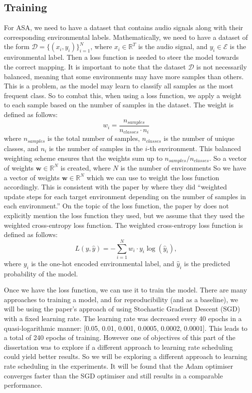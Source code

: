 \documentclass[logo,bsc,singlespacing,parskip,online]{infthesis}
\begin{document}
\subsection{Training}
For ASA, we need to have a dataset that contains audio signals along with their corresponding environmental labels. 
Mathematically, we need to have a dataset of the form \(\mathcal{D} = \{(x_i, y_i)\}_{i=1}^{N}\), where \(x_i \in \mathbb{R}^{T}\) is the audio signal, and \(y_i \in \mathcal{E}\) is the environmental label.
Then a loss function is needed to steer the model towards the correct mapping.
It is important to note that the dataset \(\mathcal{D}\) is not necessarily balanced,
meaning that some environments may have more samples than others.
This is a problem, as the model may learn to classify all samples as the most frequent class. 
So to combat this, when using a loss function, we apply a weight to each sample based on the number of samples in the dataset.
The weight is defined as follows:
\[
w_i = \frac{n_{samples}}{n_{classes} \cdot n_i}
\]
where \(n_{samples}\) is the total number of samples, \(n_{classes}\) is the number of unique classes, and \(n_i\) is the number of samples in the \(i\)-th environment.
This balanced weighting scheme ensures that the weights sum up to \(n_{samples}/n_{classes}\).
So a vector of weights \(\mathbf{w} \in \mathbb{R}^{N}\) is created, where \(N\) is the number of environments
So we have a vector of weights \(\mathbf{w} \in \mathbb{R}^{N}\) which we can use to weight the loss function accordingly.
This is consistent with the paper by \citet{Huwel2020HearDS} where they did ``weighted update steps for each target environment depending on the number of samples in each environment.''
On the topic of the loss function, the paper by \citet{Huwel2020HearDS} does 
not explicitly mention the loss function they used, but we assume that they used the weighted cross-entropy loss function.
The weighted cross-entropy loss function is defined as follows:
\[
L(y, \hat{y}) = -\sum_{i=1}^{N} w_i \cdot y_i \log(\hat{y}_i),
\]
where \(y_i\) is the one-hot encoded environmental label, and \(\hat{y}_i\) is the predicted probability of the model.

Once we have the loss function, we can use it to train the model. There are many approaches to training a model,
and for reproducibility (and as a baseline), we will be using the paper's approach of using Stochastic Gradient Descent (SGD) with a fixed learning rate.
The learning rate was decreased every 40 epochs in a quasi-logarithmic manner: [0.05, 0.01, 0.001, 0.0005, 0.0002, 0.0001].
This leads to a total of 240 epochs of training. 
However one of objectives of this part of the dissertation was to explore if a different approach to learning rate scheduling
could yield better results. So we will be exploring a different approach to learning rate scheduling in the experiments.
It will be found that the Adam optimiser converges faster than the SGD optimiser and still results in a comparable 
performance. 
\end{document}
